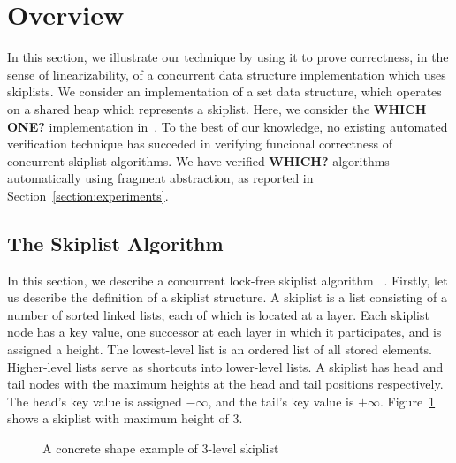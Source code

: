 \section{Overview}
\label{sec:overview}

  In this section, we illustrate our technique by using it to prove correctness, in
the sense of linearizability, of
a concurrent data structure implementation which uses skiplists.
We consider an implementation of a set data structure, which operates on
a shared heap which represents a skiplist. Here, we consider the
{\bf WHICH ONE?} implementation in~\cite{ArtOfMpP}.
To the best of our knowledge, no existing automated verification technique
has succeded in verifying funcional correctness of concurrent
skiplist algorithms.
We have verified {\bf WHICH?} algorithms automatically using fragment
abstraction, as reported in Section~\ref{section:experiments}.


\subsection{The Skiplist Algorithm}
  
In this section, we describe a concurrent lock-free skiplist algorithm ~\cite{ArtOfMpP}. Firstly, let us describe the definition of a skiplist structure. A skiplist is a list consisting of a number of sorted linked lists, each of which is located at a layer. Each skiplist node has a key value, one successor at each layer in which it participates, and is assigned a height. The lowest-level list is an ordered list of all stored elements. Higher-level lists serve as shortcuts into lower-level lists.
A skiplist has head and tail nodes with the maximum heights at the head and tail positions respectively. The head’s key value is assigned $-\infty$, and the tail’s key value is $+\infty$. Figure~\ref{sl} shows a skiplist with maximum height of 3.
\begin{figure}
\center  
 
  \caption{A concrete shape example of 3-level skiplist}
\label{sl}
\end{figure}



